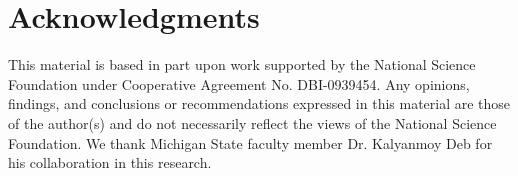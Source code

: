 \documentclass{sig-alternate-05-2015}
\begin{document}
\section{Acknowledgments}

This material is based in part upon work supported by the
National Science Foundation under Cooperative Agreement
No.  DBI-0939454.  Any opinions, findings, and conclusions or
recommendations expressed in this material are those of the
author(s) and do not necessarily reflect the views of the
National Science Foundation.  We thank Michigan State faculty
member Dr. Kalyanmoy Deb for his collaboration in this research.
\pagebreak


\end{document}
